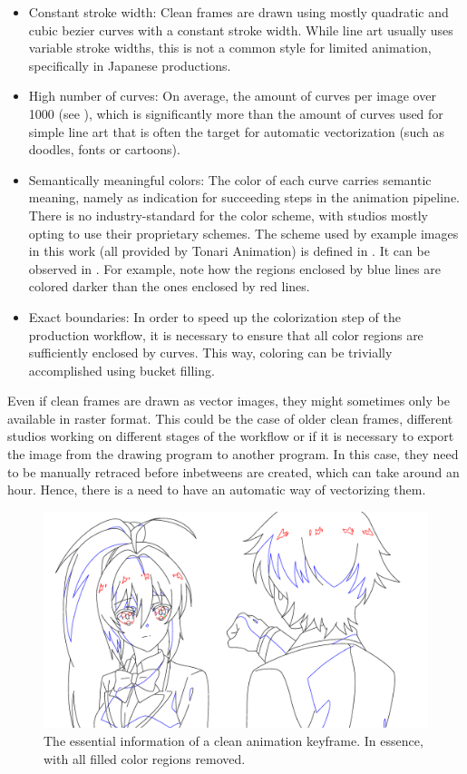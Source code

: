 \begin{itemize}
    \item Constant stroke width: Clean frames are drawn using mostly quadratic and cubic bezier curves with a constant stroke width. While line art usually uses variable stroke widths, this is not a common style for limited animation, specifically in Japanese productions. 
    \item High number of curves:  On average, the amount of curves per image over 1000 (see ), which is significantly more than the amount of curves used for simple line art that is often the target for automatic vectorization (such as doodles, fonts or cartoons).
    \item Semantically meaningful colors: The color of each curve carries semantic meaning, namely as indication for succeeding steps in the animation pipeline. There is no industry-standard for the color scheme, with studios mostly opting to use their proprietary schemes. The scheme used by example images in this work (all provided by Tonari Animation) is defined in . It can be observed in . For example, note how the regions enclosed by blue lines are colored darker than the ones enclosed by red lines.
    \item Exact boundaries: In order to speed up the colorization step of the production workflow, it is necessary to ensure that all color regions are sufficiently enclosed by curves. This way, coloring can be trivially accomplished using bucket filling.
\end{itemize}

Even if clean frames are drawn as vector images, they might sometimes only be available in raster format. This could be the case of older clean frames, different studios working on different stages of the workflow or if it is necessary to export the image from the drawing program to another program. In this case, they need to be manually retraced before inbetweens are created, which can take around an hour. Hence, there is a need to have an automatic way of vectorizing them.

\begin{figure}[h]
    \centering
    \includegraphics[width=\textwidth]{graphics/douga/39.pdf}
    \caption{The essential information of a clean animation keyframe. In essence,  with all filled color regions removed.}
    \label{fig:clean-frame-vec}
\end{figure}

